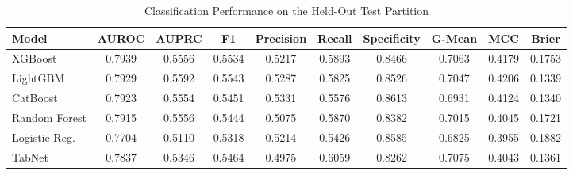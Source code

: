\begin{table}
\centering
\caption{Classification Performance on the Held-Out Test Partition}
\label{tab:results}
\begin{tabular}{lccccccccc}
\toprule
Model & AUROC & AUPRC & F1 & Precision & Recall & Specificity & G-Mean & MCC & Brier \\
\midrule
XGBoost & 0.7939 & 0.5556 & 0.5534 & 0.5217 & 0.5893 & 0.8466 & 0.7063 & 0.4179 & 0.1753 \\
LightGBM & 0.7929 & 0.5592 & 0.5543 & 0.5287 & 0.5825 & 0.8526 & 0.7047 & 0.4206 & 0.1339 \\
CatBoost & 0.7923 & 0.5554 & 0.5451 & 0.5331 & 0.5576 & 0.8613 & 0.6931 & 0.4124 & 0.1340 \\
Random Forest & 0.7915 & 0.5556 & 0.5444 & 0.5075 & 0.5870 & 0.8382 & 0.7015 & 0.4045 & 0.1721 \\
Logistic Reg. & 0.7704 & 0.5110 & 0.5318 & 0.5214 & 0.5426 & 0.8585 & 0.6825 & 0.3955 & 0.1882 \\
TabNet & 0.7837 & 0.5346 & 0.5464 & 0.4975 & 0.6059 & 0.8262 & 0.7075 & 0.4043 & 0.1361 \\
\bottomrule
\end{tabular}
\end{table}
